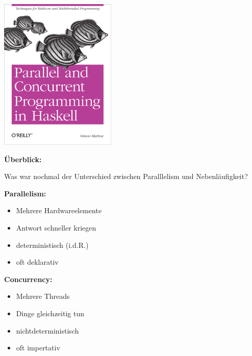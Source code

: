 \documentclass{beamer}
\begin{document}

\begin{frame}

\begin{center}
\includegraphics[scale=1]{../Woche6/parcur.png} 
\end{center}

\end{frame}


\begin{frame}

\textbf{Überblick:}

Was war nochmal der Unterschied zwischen Paralllelism und Nebenläufigkeit?
\pause

\begin{multicols}{2}
\textbf{Parallelism:}
\begin{itemize}
\item Mehrere Hardwareelemente\pause
\item Antwort schneller kriegen\pause
\item deterministisch (i.d.R.)\pause
\item oft deklarativ\pause
\end{itemize}
\columnbreak
\textbf{Concurrency:}
\begin{itemize}
\item Mehrere Threads\pause
\item Dinge gleichzeitig tun\pause
\item nichtdeterministisch\pause
\item oft impertativ
\end{itemize}
\end{multicols}

\end{frame}
\end{document}
